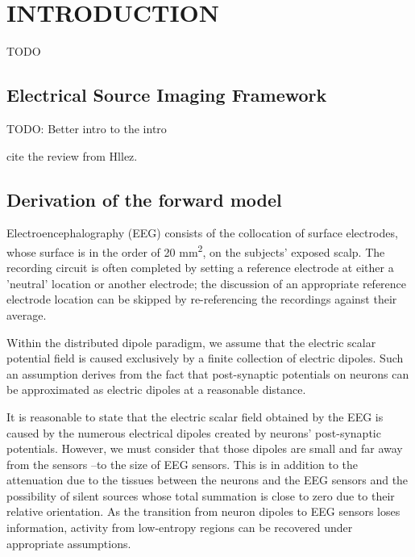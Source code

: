 \chapter{INTRODUCTION}


\label{ch:intro}

TODO

\section{Electrical Source Imaging Framework}

TODO: Better intro to the intro

cite the review from Hllez\cite{hallez2007review}.

    


\section{Derivation of the forward model}

Electroencephalography (EEG) consists of the collocation of surface electrodes, whose surface is in the order of 20 \si{mm^2}, on the subjects' exposed scalp.
%
The recording circuit is often completed by setting a reference electrode at either a 'neutral' location or another electrode; the discussion of an appropriate reference electrode location can be skipped by re-referencing the recordings against their average.

Within the distributed dipole paradigm, we assume that the electric scalar potential field is caused exclusively by a finite collection of electric dipoles. 
%
Such an assumption derives from the fact that post-synaptic potentials on neurons can be approximated as electric dipoles at a reasonable distance.

It is reasonable to state that the electric scalar field obtained by the EEG is caused by the numerous electrical dipoles created by neurons' post-synaptic potentials.
%
However, we must consider that those dipoles are small and far away from the sensors --to the size of EEG sensors.
%
This is in addition to the attenuation due to the tissues between the neurons and the EEG sensors and the possibility of silent sources whose total summation is close to zero due to their relative orientation.
%
As the transition from neuron dipoles to EEG sensors loses information, activity from low-entropy regions can be recovered under appropriate assumptions.

